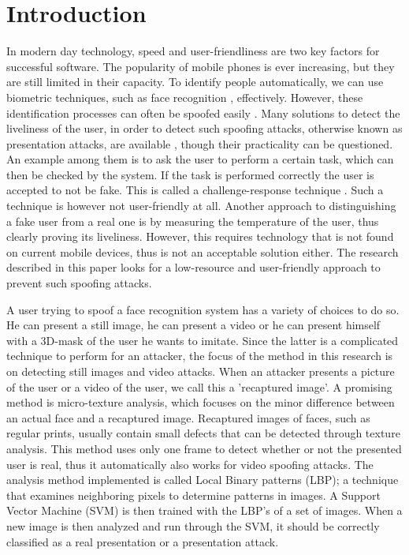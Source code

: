 \documentclass{sig-alternate-br}
\begin{document}
\section{Introduction} \label{introduction}
In modern day technology, speed and user-friendliness are two key factors for successful software. The popularity of mobile phones is ever increasing, but they are still limited in their capacity. To identify people automatically, we can use biometric techniques, such as face recognition \cite{zhao2003face}, effectively. However, these identification processes can often be spoofed easily \cite{anjos2014face}. Many solutions to detect the liveliness of the user, in order to detect such spoofing attacks, otherwise known as presentation attacks, are available \cite{bao2009liveness}, though their practicality can be questioned. An example among them is to ask the user to perform a certain task, which can then be checked by the system. If the task is performed correctly the user is accepted to not be fake. This is called a challenge-response technique \cite{bolle2005system}. Such a technique is however not user-friendly at all. Another approach to distinguishing a fake user from a real one is by measuring the temperature of the user, thus clearly proving its liveliness. However, this requires technology that is not found on current mobile devices, thus is not an acceptable solution either. The research described in this paper looks for a low-resource and user-friendly approach to prevent such spoofing attacks.

A user trying to spoof a face recognition system has a variety of choices to do so. He can present a still image, he can present a video or he can present himself with a 3D-mask of the user he wants to imitate. Since the latter is a complicated technique to perform for an attacker, the focus of the method in this research is on detecting still images and video attacks. When an attacker presents a picture of the user or a video of the user, we call this a 'recaptured image'. A promising method is micro-texture analysis, which focuses on the minor difference between an actual face and a recaptured image. Recaptured images of faces, such as regular prints, usually contain small defects that can be detected through texture analysis. This method uses only one frame to detect whether or not the presented user is real, thus it automatically also works for video spoofing attacks. The analysis method implemented is called Local Binary patterns (LBP); a technique that examines neighboring pixels to determine patterns in images. A Support Vector Machine (SVM) is then trained with the LBP's of a set of images. When a new image is then analyzed and run through the SVM, it should be correctly classified as a real presentation or a presentation attack.
\end{document}
